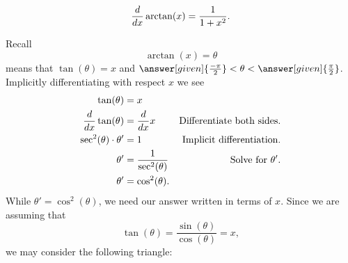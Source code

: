 \documentclass{ximera}
\begin{document}
\begin{theorem}
  \[
  \frac{d}{\mathop{}\!d x} \arctan(x) = \frac{1}{1+x^2}.
  \]
  \begin{explanation} 
    Recall
    \[
    \arctan(x) = \theta
    \]
    means that $\tan(\theta) = x$ and $\answer[given]{\frac{-\pi}{2}}<
    \theta< \answer[given]{\frac{\pi}{2}}$.  Implicitly
    differentiating with respect $x$ we see
    \begin{align*}
      \tan(\theta) &= x\\
      \frac{d}{\mathop{}\!d x} \tan(\theta) &= \frac{d}{\mathop{}\!d x} x         &\text{Differentiate both sides.}\\
      \sec^2(\theta) \cdot \theta' &= 1   &\text{Implicit differentiation.}\\
      \theta' &= \frac{1}{\sec^2(\theta)} &\text{Solve for $\theta'$.}\\
      \theta' &= \cos^2(\theta).
    \end{align*}
    While $\theta' = \cos^2(\theta)$, we need our answer written in terms
    of $x$. Since we are assuming that
    \[
    \tan(\theta) = \frac{\sin(\theta)}{\cos(\theta)}= x,
    \]
    we may consider the following triangle:
    \begin{image}[2in]
\end{image}
\end{explanation}
\end{theorem}
\end{document}

